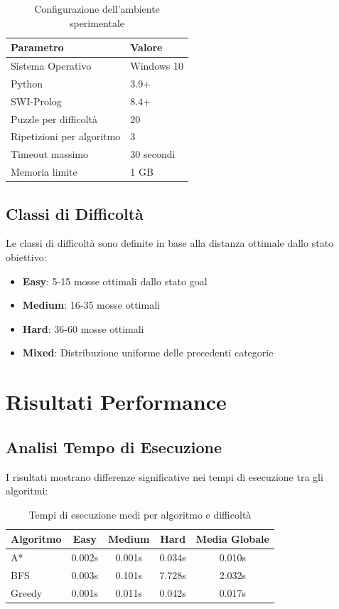 \documentclass[12pt,a4paper]{report}
\theoremstyle{definition}
\begin{document}
\begin{table}[H]
\centering
\caption{Configurazione dell'ambiente sperimentale}
\begin{tabular}{|l|l|}
\hline
\textbf{Parametro} & \textbf{Valore} \\
\hline
Sistema Operativo & Windows 10 \\
Python & 3.9+ \\
SWI-Prolog & 8.4+ \\
Puzzle per difficoltà & 20 \\
Ripetizioni per algoritmo & 3 \\
Timeout massimo & 30 secondi \\
Memoria limite & 1 GB \\
\hline
\end{tabular}
\end{table}

\subsection{Classi di Difficoltà}

Le classi di difficoltà sono definite in base alla distanza ottimale dallo stato obiettivo:

\begin{itemize}
    \item \textbf{Easy}: 5-15 mosse ottimali dallo stato goal
    \item \textbf{Medium}: 16-35 mosse ottimali 
    \item \textbf{Hard}: 36-60 mosse ottimali
    \item \textbf{Mixed}: Distribuzione uniforme delle precedenti categorie
\end{itemize}

\section{Risultati Performance}

\subsection{Analisi Tempo di Esecuzione}

I risultati mostrano differenze significative nei tempi di esecuzione tra gli algoritmi:

\begin{table}[H]
\centering
\caption{Tempi di esecuzione medi per algoritmo e difficoltà}
\begin{tabular}{|l|c|c|c|c|}
\hline
\textbf{Algoritmo} & \textbf{Easy} & \textbf{Medium} & \textbf{Hard} & \textbf{Media Globale} \\
\hline
A* & 0.002s & 0.001s & 0.034s & 0.010s \\
BFS & 0.003s & 0.101s & 7.728s & 2.032s \\
Greedy & 0.001s & 0.011s & 0.042s & 0.017s \\
\hline
\end{tabular}
\end{table}
\end{document}

